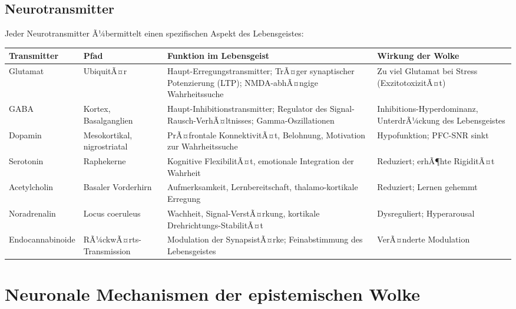 ﻿\documentclass[12pt,a4paper]{report}
\theoremstyle{plain}
\theoremstyle{definition}
\theoremstyle{remark}
\begin{document}
	\section{Neurotransmitter}
	
	Jeder Neurotransmitter Ã¼bermittelt einen spezifischen Aspekt des Lebensgeistes:
	
	\begin{longtable}{@{}p{2.8cm}p{2.2cm}p{5.8cm}p{3.5cm}@{}}
		\toprule
		\textbf{Transmitter} & \textbf{Pfad} & \textbf{Funktion im Lebensgeist} & \textbf{Wirkung der Wolke}\\
		\midrule
		Glutamat & UbiquitÃ¤r & Haupt-Erregungstransmitter; TrÃ¤ger synaptischer Potenzierung (LTP); NMDA-abhÃ¤ngige Wahrheitssuche & Zu viel Glutamat bei Stress (ExzitotoxizitÃ¤t)\\[4pt]
		GABA & Kortex, Basalganglien & Haupt-Inhibitionstransmitter; Regulator des Signal-Rausch-VerhÃ¤ltnisses; Gamma-Oszillationen & Inhibitions-Hyperdominanz, UnterdrÃ¼ckung des Lebensgeistes\\[4pt]
		Dopamin & Mesokortikal, nigrostriatal & PrÃ¤frontale KonnektivitÃ¤t, Belohnung, Motivation zur Wahrheitssuche & Hypofunktion; PFC-SNR sinkt\\[4pt]
		Serotonin & Raphekerne & Kognitive FlexibilitÃ¤t, emotionale Integration der Wahrheit & Reduziert; erhÃ¶hte RigiditÃ¤t\\[4pt]
		Acetylcholin & Basaler Vorderhirn & Aufmerksamkeit, Lernbereitschaft, thalamo-kortikale Erregung & Reduziert; Lernen gehemmt\\[4pt]
		Noradrenalin & Locus coeruleus & Wachheit, Signal-VerstÃ¤rkung, kortikale Drehrichtungs-StabilitÃ¤t & Dysreguliert; Hyperarousal\\[4pt]
		Endocannabinoide & RÃ¼ckwÃ¤rts-Transmission & Modulation der SynapsistÃ¤rke; Feinabstimmung des Lebensgeistes & VerÃ¤nderte Modulation\\
		\bottomrule
	\end{longtable}
	
	\chapter{Neuronale Mechanismen der epistemischen Wolke}
	
\end{document}
